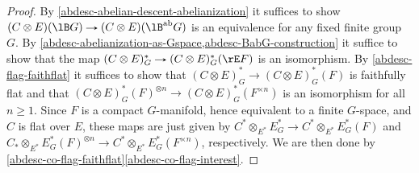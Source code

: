 \begin{proof}
  By \cref{abdesc-abelian-descent-abelianization} it suffices to show
  $(C \otimes E)(\lB G) \to (C \otimes E)(\lB^\ab G)$ is an
  equivalence for any fixed finite group $G$. By
  \cref{abdesc-abelianization-as-Gspace,abdesc-BabG-construction} it
  suffice to show that the map
  $(C \otimes E)_G^* \to (C \otimes E)_G^*(\rE F)$ is an
  isomorphism. By \cref{abdesc-flag-faithflat} it suffices to show
  that $(C \otimes E)_G^* \to (C \otimes E)_G^*(F)$ is faithfully flat
  and that
  $(C \otimes E)_G^*(F)^{\otimes n} \to (C \otimes E)_G^*(F^{\times
    n})$
  is an isomorphism for all $n \ge 1$. Since $F$ is a compact
  $G$-manifold, hence equivalent to a finite $G$-space, and $C$ is
  flat over $E$, these maps are just given by
  $C^* \otimes_{E^*} E_G^* \to C^* \otimes_{E^*} E_G^*(F)$ and
  $C_* \otimes_{E^*} E_G^*(F)^{\otimes n} \to C^* \otimes_{E^*}
  E_G^*(F^{\times n})$,
  respectively. We are then done by
  \cref{abdesc-co-flag-faithflat}\cref{abdesc-co-flag-interest}.
\end{proof}
